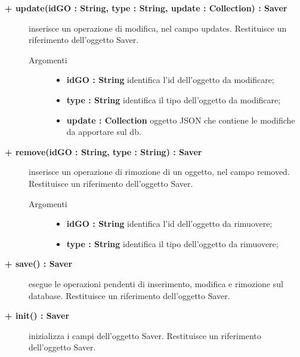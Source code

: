 \begin{description}
	\begin{description}
		\item[\textbf{\color{blue}+ update(idGO : String, type : String, update : Collection) : Saver			}] \hfill
			inserisce un operazione di modifica, nel campo updates. Restituisce un riferimento dell'oggetto Saver.
			
		\begin{description}
			\item[Argomenti] \hfill
				\begin{itemize}
				
					\item \textbf{idGO : String			} \hfill
					identifica l'id dell'oggetto da modificare;
					\item \textbf{type : String			} \hfill
					identifica il tipo dell'oggetto da modificare;
					\item \textbf{update : Collection			} \hfill
					oggetto JSON che contiene le modifiche da apportare sul db. 
				\end{itemize}
		\end{description}
	\end{description}

	\begin{description}
		\item[\textbf{\color{blue}+ remove(idGO : String, type : String) : Saver			}] \hfill
			inserisce un operazione di rimozione di un oggetto, nel campo removed. Restituisce un riferimento dell'oggetto Saver.
			
		\begin{description}
			\item[Argomenti] \hfill
				\begin{itemize}
				
					\item \textbf{idGO : String			} \hfill
					identifica l'id dell'oggetto da rimuovere;
					\item \textbf{type : String			} \hfill
					identifica il tipo dell'oggetto da rimuovere;
				\end{itemize}
		\end{description}
	\end{description}
	
		\begin{description}
		\item[\textbf{\color{blue}+ save() : Saver			}] \hfill
			esegue le operazioni pendenti di inserimento, modifica e rimozione sul database. Restituisce un riferimento dell'oggetto Saver.
		\end{description}

		\begin{description}
		\item[\textbf{\color{blue}+ init() : Saver			}] \hfill
			inizializza i campi dell'oggetto Saver. Restituisce un riferimento dell'oggetto Saver.
		\end{description}	
	
\end{description}



